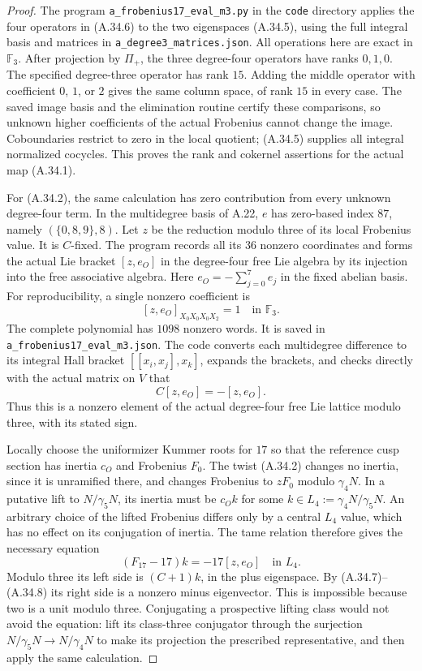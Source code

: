 \begin{proof}
The program \texttt{a\_frobenius17\_eval\_m3.py} in the
\texttt{code} directory applies the four operators in
(A.34.6) to the two eigenspaces (A.34.5), using the full
integral basis and matrices in
\texttt{a\_degree3\_matrices.json}.
All operations here are exact in $\mathbb F_3$.
After projection by $\Pi_+$, the three degree-four
operators have ranks $0,1,0$. The specified
degree-three operator has rank $15$. Adding the middle
operator with coefficient $0$, $1$, or $2$ gives the
same column space, of rank $15$ in every case.
The saved image basis and the elimination routine
certify these comparisons, so unknown higher coefficients
of the actual Frobenius cannot change the image.
Coboundaries restrict to zero in the local quotient;
(A.34.5) supplies all integral normalized cocycles.
This proves the rank and cokernel assertions for the
actual map (A.34.1).

For (A.34.2), the same calculation has zero contribution
from every unknown degree-four term. In the multidegree
basis of A.22, $e$ has zero-based index $87$, namely
$(\{0,8,9\},8)$. Let $z$ be the reduction modulo three
of its local Frobenius value. It is $C$-fixed. The program
records all its $36$ nonzero coordinates and forms the
actual Lie bracket $[z,e_O]$ in the degree-four free Lie
algebra by its injection into the free associative algebra.
Here
$e_O=-\sum_{j=0}^7e_j$ in the fixed abelian basis.
For reproducibility, a single nonzero coefficient is
\[
 [z,e_O]_{X_0X_0X_0X_2}=1\quad\text{in }\mathbb F_3.
 \tag{A.34.7}
\]
The complete polynomial has $1098$ nonzero words. It is
saved in \texttt{a\_frobenius17\_\allowbreak eval\_m3.json}.
The code converts each multidegree difference to its
integral Hall bracket $[[x_i,x_j],x_k]$, expands the
brackets, and checks directly with the actual matrix on
$V$ that
\[
                    C[z,e_O]=-[z,e_O].
 \tag{A.34.8}
\]
Thus this is a nonzero element of the actual degree-four
free Lie lattice modulo three, with its stated sign.

Locally choose the uniformizer Kummer roots for $17$
so that the reference cusp section has inertia $c_O$
and Frobenius $F_0$. The twist (A.34.2) changes no
inertia, since it is unramified there, and changes
Frobenius to $zF_0$ modulo $\gamma_4N$.
In a putative lift to $N/\gamma_5N$, its inertia must
be $c_Ok$ for some
$k\in L_4:=\gamma_4N/\gamma_5N$. An arbitrary choice
of the lifted Frobenius differs only by a central
$L_4$ value, which has no effect on its conjugation
of inertia. The tame relation therefore gives the
necessary equation
\[
                 (F_{17}-17)k=-17[z,e_O]
                         \quad\text{in }L_4.
 \tag{A.34.9}
\]
Modulo three its left side is $(C+1)k$, in the plus
eigenspace. By (A.34.7)--(A.34.8) its right side is a
nonzero minus eigenvector. This is impossible because
two is a unit modulo three. Conjugating a prospective
lifting class would not avoid the equation: lift its
class-three conjugator through the surjection
$N/\gamma_5N\to N/\gamma_4N$ to make its projection
the prescribed representative, and then apply the
same calculation.


\end{proof}
